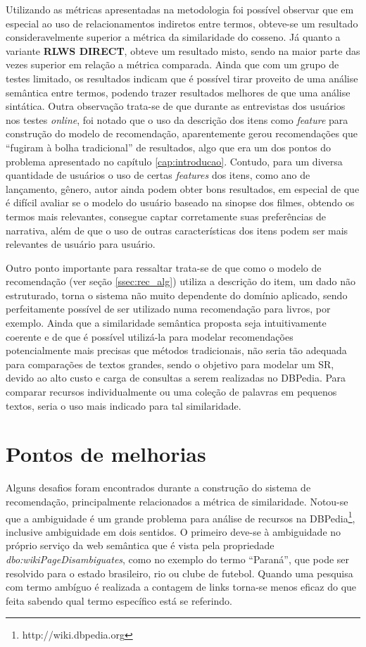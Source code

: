 Utilizando as métricas apresentadas na metodologia foi possível observar que em especial ao uso de relacionamentos indiretos entre termos, obteve-se um resultado consideravelmente superior a métrica da similaridade do cosseno. Já quanto a variante \textbf{RLWS DIRECT}, obteve um resultado misto, sendo na maior parte das vezes superior em relação a métrica comparada. Ainda que com um grupo de testes limitado, os resultados indicam que é possível tirar proveito de uma análise semântica entre termos, podendo trazer resultados melhores de que uma análise sintática. Outra observação trata-se de que durante as entrevistas dos usuários nos testes \textit{online}, foi notado que o uso da descrição dos itens como \textit{feature} para construção do modelo de recomendação, aparentemente gerou recomendações que \enquote{fugiram à bolha tradicional} de resultados, algo que era um dos pontos do problema apresentado no capítulo \ref{cap:introducao}. Contudo, para um diversa quantidade de usuários o uso de certas \textit{features} dos itens, como ano de lançamento, gênero, autor ainda podem obter bons resultados, em especial de que é difícil avaliar se o modelo do usuário baseado na sinopse dos filmes, obtendo os termos mais relevantes, consegue captar corretamente suas preferências de narrativa, além de que o uso de outras características dos itens podem ser mais relevantes de usuário para usuário.

Outro ponto importante para ressaltar trata-se de que como o modelo de recomendação (ver seção \ref{ssec:rec_alg}) utiliza a descrição do item, um dado não estruturado, torna o sistema não muito dependente do domínio aplicado, sendo perfeitamente possível de ser utilizado numa recomendação para livros, por exemplo. Ainda que a similaridade semântica proposta seja intuitivamente coerente e de que é possível utilizá-la para modelar recomendações potencialmente mais precisas que métodos tradicionais, não seria tão adequada para comparações de textos grandes, sendo o objetivo para modelar um \ac{SR}, devido ao alto custo e carga de consultas a serem realizadas no DBPedia. Para comparar recursos individualmente ou uma coleção de palavras em pequenos textos, seria o uso mais indicado para tal similaridade.

\section{Pontos de melhorias}

Alguns desafios foram encontrados durante a construção do sistema de recomendação, principalmente relacionados a métrica de similaridade. Notou-se que a ambiguidade é um grande problema para análise de recursos na DBPedia\footnote{http://wiki.dbpedia.org}, inclusive ambiguidade em dois sentidos. O primeiro deve-se à ambiguidade no próprio serviço da web semântica que é vista pela propriedade \textit{dbo:wikiPageDisambiguates}, como no exemplo do termo \enquote{Paraná}, que pode ser resolvido para o estado brasileiro, rio ou clube de futebol. Quando uma pesquisa com termo ambíguo é realizada a contagem de links torna-se menos eficaz do que feita sabendo qual termo específico está se referindo. 

